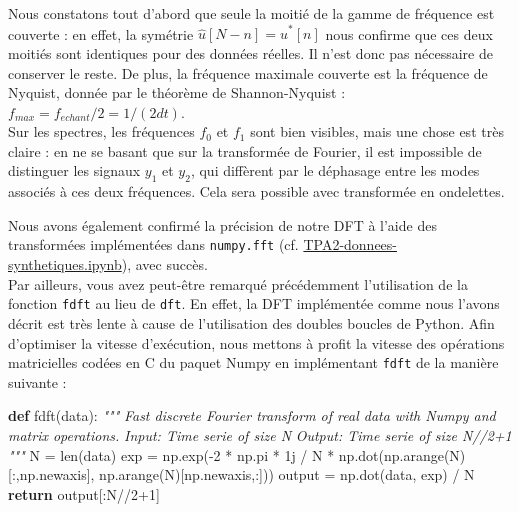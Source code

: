 \documentclass[11pt]{article}
\newenvironment{Shaded}{}{}
\newcommand{\KeywordTok}[1]{\textcolor[rgb]{0.00,0.44,0.13}{\textbf{{#1}}}}
\newcommand{\DecValTok}[1]{\textcolor[rgb]{0.25,0.63,0.44}{{#1}}}
\newcommand{\CommentTok}[1]{\textcolor[rgb]{0.38,0.63,0.69}{\textit{{#1}}}}
\newcommand{\NormalTok}[1]{{#1}}
\newcommand{\ControlFlowTok}[1]{\textcolor[rgb]{0.00,0.44,0.13}{\textbf{{#1}}}}
\newcommand{\OperatorTok}[1]{\textcolor[rgb]{0.40,0.40,0.40}{{#1}}}
\newcommand{\BuiltInTok}[1]{{#1}}
\begin{document}
    Nous constatons tout d'abord que seule la moitié de la gamme de
fréquence est couverte : en effet, la symétrie $ \hat{u}\left[N - n\right] =
\hat{u}^{*}\left[n\right]$ nous confirme que ces deux moitiés sont identiques
pour des données réelles. Il n'est donc pas nécessaire de conserver le
reste. De plus, la fréquence maximale couverte est la fréquence de
Nyquist, donnée par le théorème de Shannon-Nyquist :
\(f_{max} = f_{echant}/2 = 1/(2dt)\).\\
Sur les spectres, les fréquences \(f_0\) et \(f_1\) sont bien visibles,
mais une chose est très claire : en ne se basant que sur la transformée
de Fourier, il est impossible de distinguer les signaux \(y_1\) et
\(y_2\), qui diffèrent par le déphasage entre les modes associés à ces
deux fréquences. Cela sera possible avec transformée en ondelettes.

    Nous avons également confirmé la précision de notre DFT à l'aide des
transformées implémentées dans \texttt{numpy.fft} (cf.
\href{http://nbviewer.jupyter.org/github/gbogopolsky/spectral-analysis-astro/blob/master/TPA2-donnees-synthetiques.ipynb?flush_cache=true}{TPA2-donnees-synthetiques.ipynb}),
avec succès.\\
Par ailleurs, vous avez peut-être remarqué précédemment l'utilisation de
la fonction \texttt{fdft} au lieu de \texttt{dft}. En effet, la DFT
implémentée comme nous l'avons décrit est très lente à cause de
l'utilisation des doubles boucles de Python. Afin d'optimiser la vitesse
d'exécution, nous mettons à profit la vitesse des opérations
matricielles codées en C du paquet Numpy en implémentant \texttt{fdft}
de la manière suivante :

\begin{Shaded}
\begin{Highlighting}[]
\KeywordTok{def}\NormalTok{ fdft(data):}
    \CommentTok{"""}
\CommentTok{    Fast discrete Fourier transform of real data with Numpy and matrix operations.}
\CommentTok{    Input: Time serie of size N}
\CommentTok{    Output: Time serie of size N//2+1}
\CommentTok{    """}
\NormalTok{    N }\OperatorTok{=} \BuiltInTok{len}\NormalTok{(data)}
\NormalTok{    exp }\OperatorTok{=}\NormalTok{ np.exp(}\OperatorTok{-}\DecValTok{2} \OperatorTok{*}\NormalTok{ np.pi }\OperatorTok{*}\NormalTok{ 1j }\OperatorTok{/}\NormalTok{ N }\OperatorTok{*}\NormalTok{ np.dot(np.arange(N)[:,np.newaxis], np.arange(N)[np.newaxis,:]))}
\NormalTok{    output }\OperatorTok{=}\NormalTok{ np.dot(data, exp) }\OperatorTok{/}\NormalTok{ N}
    \ControlFlowTok{return}\NormalTok{ output[:N}\OperatorTok{//}\DecValTok{2}\OperatorTok{+}\DecValTok{1}\NormalTok{]}
\end{Highlighting}
\end{Shaded}
\end{document}
